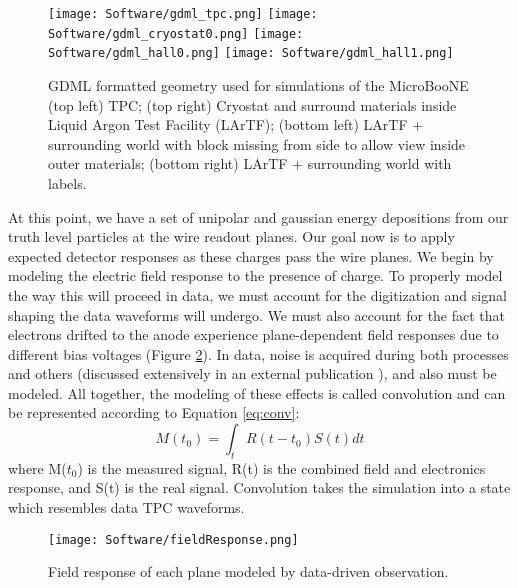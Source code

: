 \begin{figure}[H]
\centering
\texttt{[image: Software/gdml\_tpc.png]}
\hspace{2 mm}
\texttt{[image: Software/gdml\_cryostat0.png]}
\hspace{2 mm}
\texttt{[image: Software/gdml\_hall0.png]}
\hspace{2 mm}
\texttt{[image: Software/gdml\_hall1.png]}
\caption{GDML formatted geometry used for simulations of the MicroBooNE (top left) TPC; (top right) Cryostat and surround materials inside Liquid Argon Test Facility (LArTF); (bottom left) LArTF + surrounding world with block missing from side to allow view inside outer materials; (bottom right) LArTF + surrounding world with labels. }
\label{fig:gdml}
\end{figure}


\par  At this point, we have a set of unipolar and gaussian energy depositions from our truth level particles at the wire readout planes. Our goal now is to apply expected detector responses as these charges pass the wire planes.  We begin by modeling the electric field response to the presence of charge. To properly model the way this will proceed in data, we must account for the digitization and signal shaping the data waveforms will undergo.  We must also account for the fact that electrons drifted to the anode experience plane-dependent field responses due to different bias voltages (Figure \ref{fig:fieldResponse}). In data, noise is acquired during both processes and others (discussed extensively in an external publication \cite{bib:noise}), and also must be modeled.  All together, the modeling of these effects is called convolution and can be represented according to Equation \ref{eq:conv}:
\begin{equation}
\label{eq:conv}
M(t_0) = \int_{t} R(t - t_0) S(t) dt
\end{equation}
where M($t_0$) is the measured signal, R(t) is the combined field and electronics response, and S(t) is the real signal.  Convolution takes the simulation into a state which resembles data TPC waveforms. 

\begin{figure}[H]
\centering
\texttt{[image: Software/fieldResponse.png]}
\caption{Field response of each plane modeled by data-driven observation. }
\label{fig:fieldResponse}
\end{figure}


